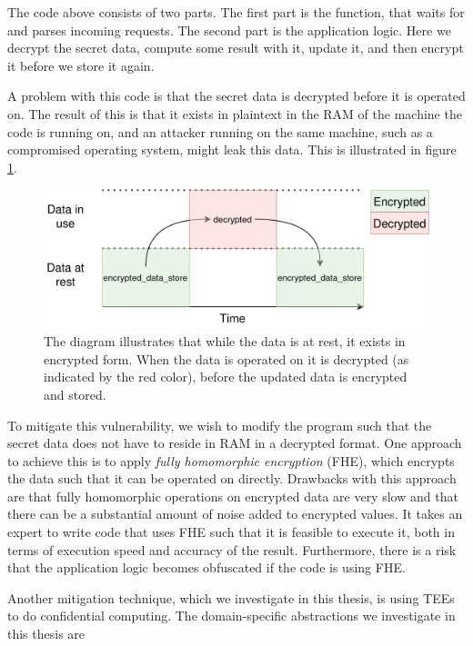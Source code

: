 The code above consists of two parts. The first part is the  function, that waits for and parses incoming
requests. The second part is the application logic. Here we decrypt the secret data, compute some result with it,
update it, and then encrypt it before we store it again.

A problem with this code is that the secret data is decrypted before it is operated on. The result of this is that it exists
in plaintext in the RAM of the machine the code is running on, and an attacker running on the same machine, such as a
compromised operating system, might leak this data. This is illustrated in figure \ref{graphics:unsafe-data-in-use}.

\begin{figure}
    \centering
    \includegraphics[scale=0.2]{graphics/unsafe-data-in-use.png}
    \caption{The diagram illustrates that while the data is at rest, it exists in encrypted form. When the data
    is operated on it is decrypted (as indicated by the red color), before the updated data is encrypted and stored.}
    \label{graphics:unsafe-data-in-use}
\end{figure}

To mitigate this vulnerability, we wish to modify the program such that the secret data does not have to reside in RAM in
a decrypted format. One approach to achieve this is to apply \textit{fully homomorphic encryption}
\cite{DBLP:conf/stoc/Gentry09} (FHE), which encrypts the data such that it can be operated on directly. Drawbacks with this
approach are that fully homomorphic operations on encrypted data are very slow and that there can be a substantial amount of
noise added to encrypted values. It takes an expert to write code that uses FHE such that it is feasible to execute it, both in
terms of execution speed and accuracy of the result. Furthermore, there is a risk that the application logic becomes obfuscated
if the code is using FHE.

Another mitigation technique, which we investigate in this thesis, is using TEEs to do confidential computing. The domain-specific
abstractions we investigate in this thesis are

